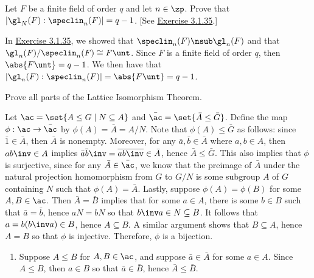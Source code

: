 \begin{problems}
    \item Let $F$ be a finite field of order $q$ and let $n \in \zp$. Prove that $|\gl_N(F) : \speclin_n(F)| = q - 1$. [See \hyperref[ex3.1.35]{Exercise 3.1.35}.]
    \begin{sol}
        In \hyperref[ex3.1.35]{Exercise 3.1.35}, we showed that $\speclin_n(F) \nsub \gl_n(F)$ and that $\gl_n(F)/\speclin_n(F) \cong F\unt$. Since $F$ is a finite field of order $q$, then $\abs{F\unt} = q - 1$. We then have that $|\gl_n(F) : \speclin_n(F)| = \abs{F\unt} = q - 1$.
    \end{sol}
    \item Prove all parts of the Lattice Isomorphism Theorem.
    \begin{sol}
        Let $\ac = \set{A \leq G \mid N \subseteq A}$ and $\bar{\ac} = \set{\bar A \leq \bar G}$. Define the map $\phi : \ac \to \bar{\ac}$ by $\phi(A) = \bar A = A/N$. Note that $\phi(A) \leq \bar G$ as follows: since $\bar 1 \in \bar A$, then $\bar A$ is nonempty. Moreover, for any $\bar a, \bar b \in \bar A$ where $a, b \in A$, then $ab\inv \in A$ implies $\bar a \bar b\inv = \overline{ab\inv} \in \bar A$, hence $\bar A \leq \bar G$. This also implies that $\phi$ is surjective, since for any $\bar A \in \bar{\ac}$, we know that the preimage of $\bar A$ under the natural projection homomorphism from $G$ to $G/N$ is some subgroup $A$ of $G$ containing $N$ such that $\phi(A) = \bar A$. Lastly, suppose $\phi(A) = \phi(B)$ for some $A, B \in \ac$. Then $\bar A = \bar B$ implies that for some $a \in A$, there is some $b \in B$ such that $\bar a = \bar b$, hence $aN = bN$ so that $b\inv a \in N \subseteq B$. It follows that $a = b(b\inv a) \in B$, hence $A \subseteq B$. A similar argument shows that $B \subseteq A$, hence $A = B$ so that $\phi$ is injective. Therefore, $\phi$ is a bijection.
        \begin{enumerate}
            \item \rightimp Suppose $A \leq B$ for $A, B \in \ac$, and suppose $\bar a \in \bar A$ for some $a \in A$. Since $A \leq B$, then $a \in B$ so that $\bar a \in \bar B$, hence $\bar A \leq \bar B$.
            

\end{enumerate}
\end{sol}
\end{problems}
